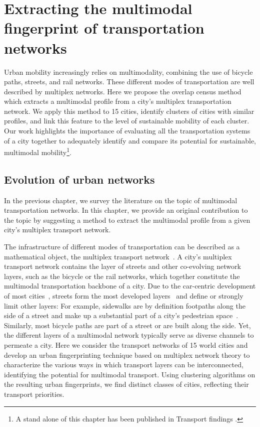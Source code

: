 \chapter{Extracting the multimodal fingerprint of transportation networks}\label{ch:OverlapCensus}

Urban mobility increasingly relies on multimodality, combining the use of bicycle paths, streets, and rail networks. These different modes of transportation are well described by multiplex networks. Here we propose the overlap census method which extracts a multimodal profile from a city's multiplex transportation network. We apply this method to 15 cities, identify clusters of cities with similar profiles, and link this feature to the level of sustainable mobility of each cluster. Our work highlights the importance of evaluating all the transportation systems of a city together to adequately identify and compare its potential for sustainable, multimodal mobility\footnote{A stand alone of this chapter has been published in Transport findings \cite{natera2020multimodal}.}.
\pagebreak

\section{Evolution of urban networks}
In the previous chapter, we survey the literature on the topic of multimodal transportation networks. In this chapter, we provide an original contribution to the topic by suggesting a method to extract the multimodal profile from a given city's multiplex transport network.

The infrastructure of different modes of transportation can be described as a mathematical object, the multiplex transport network~\cite{morris2012transport,strano2012evolution,Barthelemy2013Evolution,battiston2014structural,Gallotti2014Efficiency,dedomenico2014interconnected,strano2015features,Aleta2017Multilayer,Lee2017Morphology}. A city's multiplex transport network contains the layer of streets and other co-evolving network layers, such as the bicycle or the rail networks, which together constitute the multimodal transportation backbone of a city. Due to the car-centric development of most cities~\cite{Jacobs1961Death}, streets form the most developed layers~\cite{Gossling2016Space,Szell2018Crowdsourced} and define or strongly limit other layers: For example, sidewalks are by definition footpaths along the side of a street and make up a substantial part of a city's pedestrian space~\cite{Gossling2016Space}. Similarly, most bicycle paths are part of a street or are built along the side. Yet, the different layers of a multimodal network typically serve as diverse channels to permeate a city. Here we consider the transport networks of 15 world cities and develop an urban fingerprinting technique based on multiplex network theory to characterize the various ways in which transport layers can be interconnected, identifying the potential for multimodal transport. Using clustering algorithms on the resulting urban fingerprints, we find distinct classes of cities, reflecting their transport priorities.

